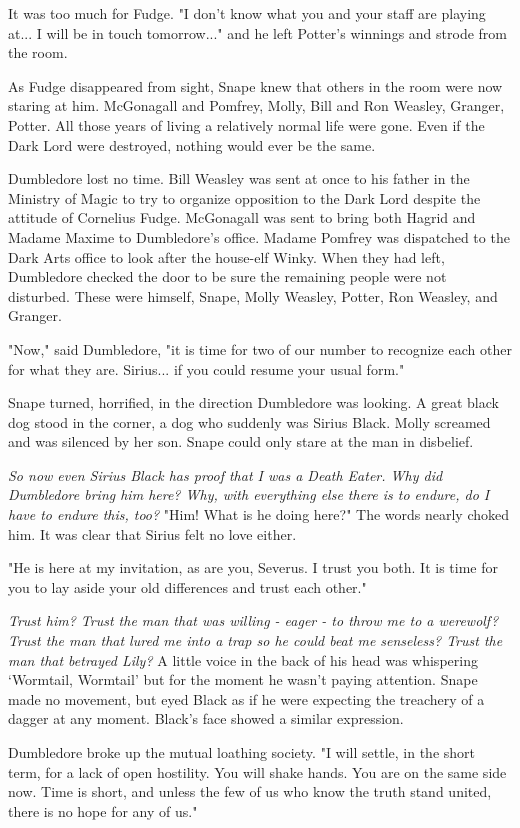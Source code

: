 \documentclass[a4paper,11pt]{article}
\begin{document}
It was too much for Fudge. "I don't know what you and your staff are playing at... I will be in touch tomorrow..." and he left Potter's winnings and strode from the room.

As Fudge disappeared from sight, Snape knew that others in the room were now staring at him. McGonagall and Pomfrey, Molly, Bill and Ron Weasley, Granger, Potter. All those years of living a relatively normal life were gone. Even if the Dark Lord were destroyed, nothing would ever be the same.

Dumbledore lost no time. Bill Weasley was sent at once to his father in the Ministry of Magic to try to organize opposition to the Dark Lord despite the attitude of Cornelius Fudge. McGonagall was sent to bring both Hagrid and Madame Maxime to Dumbledore's office. Madame Pomfrey was dispatched to the Dark Arts office to look after the house-elf Winky. When they had left, Dumbledore checked the door to be sure the remaining people were not disturbed. These were himself, Snape, Molly Weasley, Potter, Ron Weasley, and Granger.

"Now," said Dumbledore, "it is time for two of our number to recognize each other for what they are. Sirius... if you could resume your usual form."

Snape turned, horrified, in the direction Dumbledore was looking. A great black dog stood in the corner, a dog who suddenly was Sirius Black. Molly screamed and was silenced by her son. Snape could only stare at the man in disbelief.

\emph{So now even Sirius Black has proof that I was a Death Eater. Why did Dumbledore bring him here? Why, with everything else there is to endure, do I have to endure this, too?} "Him! What is he doing here?" The words nearly choked him. It was clear that Sirius felt no love either.

"He is here at my invitation, as are you, Severus. I trust you both. It is time for you to lay aside your old differences and trust each other."

\emph{Trust him? Trust the man that was willing - eager - to throw me to a werewolf? Trust the man that lured me into a trap so he could beat me senseless? Trust the man that betrayed Lily?} A little voice in the back of his head was whispering `Wormtail, Wormtail' but for the moment he wasn't paying attention. Snape made no movement, but eyed Black as if he were expecting the treachery of a dagger at any moment. Black's face showed a similar expression.

Dumbledore broke up the mutual loathing society. "I will settle, in the short term, for a lack of open hostility. You will shake hands. You are on the same side now. Time is short, and unless the few of us who know the truth stand united, there is no hope for any of us."
\end{document}
